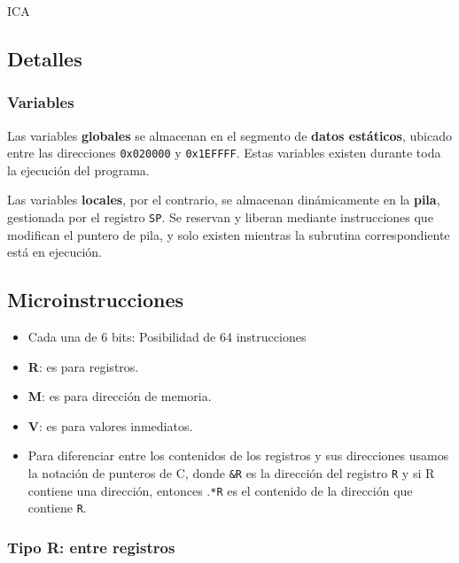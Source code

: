 ICA\documentclass{article}
\begin{document}
\subsection{Detalles}

\subsubsection{Variables}

Las variables \textbf{globales} se almacenan en el segmento de
\textbf{datos estáticos}, ubicado entre las direcciones
\texttt{0x020000} y \texttt{0x1EFFFF}. Estas variables
existen durante toda la ejecución del programa.

Las variables \textbf{locales}, por el contrario, se
almacenan dinámicamente en la \textbf{pila}, gestionada por
el registro \texttt{SP}. Se reservan y liberan mediante
instrucciones que modifican el puntero de pila,
y solo existen mientras la subrutina
correspondiente está en ejecución.

\subsection{Microinstrucciones}

\begin{itemize}
  \item Cada una de 6 bits: Posibilidad de 64 instrucciones
  \item \textbf{R}: es para registros.
  \item \textbf{M}: es para dirección de memoria.
  \item \textbf{V}: es para valores inmediatos.
  \item Para diferenciar entre los contenidos de los registros y sus direcciones usamos la notación de punteros de C, donde \texttt{\&R} es la dirección del registro \texttt{R} y si R contiene una dirección, entonces .\texttt{*R} es el contenido de la dirección que contiene \texttt{R}.
\end{itemize}

\subsubsection{Tipo R: \textbf{entre registros}}
\end{document}

